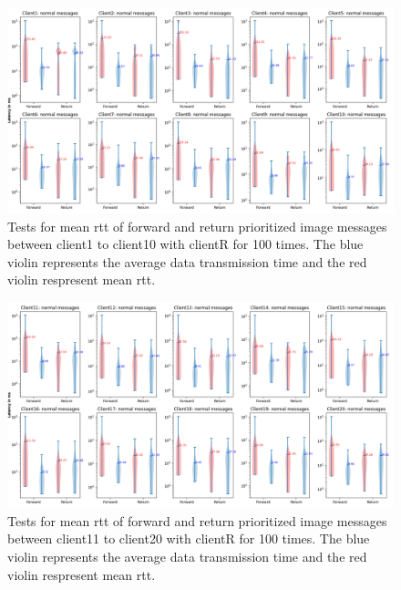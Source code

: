 \begin{figure}
    \centering
    \includegraphics[width=\textheight]{figures/appendix/priority_tests/log_violin_50clients_image_figure_1.png}\hfill 
    \caption{Tests for mean \gls{rtt} of forward and return prioritized image messages between client1 to client10 
    with clientR for 100 times. The blue violin represents the average data transmission time and the red violin 
    respresent mean \gls{rtt}.} \label{fig: priority-50clients-image-a}
\end{figure}

\begin{figure}
    \includegraphics[width=\textheight]{figures/appendix/priority_tests/log_violin_50clients_image_figure_2.png}\hfill 
    \caption{Tests for mean \gls{rtt} of forward and return prioritized image messages between client11 to client20 
    with clientR for 100 times. The blue violin represents the average data transmission time and the red violin 
    respresent mean \gls{rtt}.} \label{fig: priority-50clients-image-b}
\end{figure}

